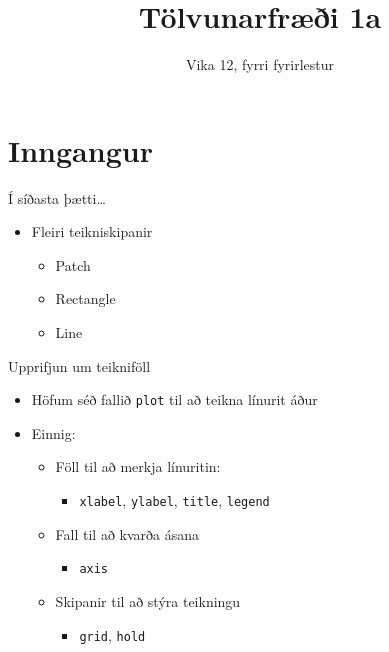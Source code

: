 \documentclass[handout]{beamer}
\title{Tölvunarfræði 1a}
\subtitle{Vika 12, fyrri fyrirlestur}
\begin{document}
\begin{frame}
\titlepage
\end{frame}

\section{Inngangur}

\begin{frame}{Í síðasta þætti\ldots}
    \begin{itemize}
        \item Fleiri teikniskipanir
        \begin{itemize}
            \item Patch
            \item Rectangle
            \item Line
        \end{itemize}
    \end{itemize}
\end{frame}

\begin{frame}{Upprifjun um teikniföll}
    \begin{itemize}
        \item Höfum séð fallið \texttt{plot} til að teikna línurit áður
        \item Einnig:
        \begin{itemize}
            \item Föll til að merkja línuritin:
        \begin{itemize}
        \item \texttt{xlabel}, \texttt{ylabel}, \texttt{title}, \texttt{legend}
        \end{itemize}
        \item Fall til að kvarða ásana
        \begin{itemize}
            \item \texttt{axis}
        \end{itemize}
        \item Skipanir til að stýra teikningu
        \begin{itemize}
            \item \texttt{grid}, \texttt{hold}
        \end{itemize}
        \end{itemize}
    \end{itemize}
\end{frame}
\end{document}
